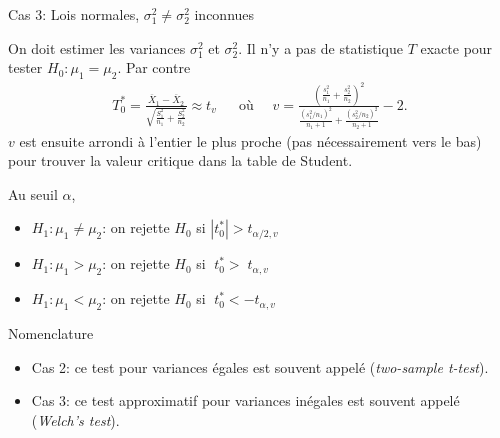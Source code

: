 \documentclass{BeamerTemplate}
\begin{document}
\begin{frame}[t]{Cas 3: Lois normales, $\sigma^2_1 \ne \sigma^2_2$ inconnues}

{\small On doit estimer  les variances $\sigma^2_1$ et $\sigma_2^2$.
Il n'y a pas de statistique $T$ exacte pour tester $H_0 : \mu_1 = \mu_2$.
Par contre
\begin{align*}
T_0^* = \frac{\overline{X}_1 - \overline{X}_2}{ \sqrt{ \frac{S^2_1}{n_1} + \frac{S^2_2}{n_2}  }} \approx t_v  & &
\mbox{o\`u }\quad v = \frac{\left( \frac{s_1^2}{n_1} + \frac{s_2^2}{n_2} \right) ^2 }{ \frac{ (s_1^2 / n_1)^2}{n_1 + 1} + \frac{ (s_2^2 / n_2)^2}{n_2 + 1}} - 2.
\end{align*}
{\footnotesize $v$ est ensuite arrondi à l'entier le plus proche (pas nécessairement vers le bas) pour trouver la valeur critique dans la table de Student.}

\medskip
Au seuil $\alpha$,

\begin{itemize}\itemsep2mm
\item $H_1 : \mu_1 \ne \mu_2$: on rejette $H_0$ si $\left| t_0^*  \right|  > t_{\alpha/2, v}$
\item $H_1 : \mu_1 > \mu_2$: on rejette $H_0$ si $\;t_0^*   > \;t_{\alpha,v}$
\item $H_1 : \mu_1 < \mu_2$: on rejette $H_0$ si $\;t_0^*   < - t_{\alpha,v}$
\end{itemize}
}
\end{frame}

\begin{frame}[t]{Nomenclature}

\begin{itemize}\itemsep1cm
\item Cas 2: ce test pour variances égales est souvent appelé  ({\it two-sample t-test}).
\item Cas 3: ce test approximatif pour variances inégales est souvent appelé  ({\it Welch's test}).
\end{itemize}

\end{frame}
\end{document}
